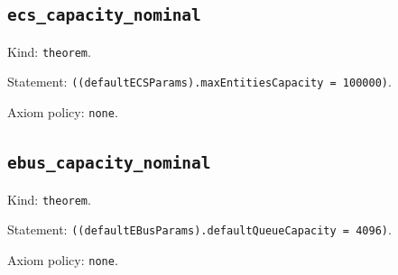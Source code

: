 \documentclass[11pt]{article}
\begin{document}
\subsection*{\texttt{ecs\_capacity\_nominal}}
\noindent Kind: \texttt{theorem}.\par
\noindent Statement: \texttt{((defaultECSParams).maxEntitiesCapacity = 100000)}.\par
\noindent Axiom policy: \texttt{none}.\par
\subsection*{\texttt{ebus\_capacity\_nominal}}
\noindent Kind: \texttt{theorem}.\par
\noindent Statement: \texttt{((defaultEBusParams).defaultQueueCapacity = 4096)}.\par
\noindent Axiom policy: \texttt{none}.\par
\end{document}
